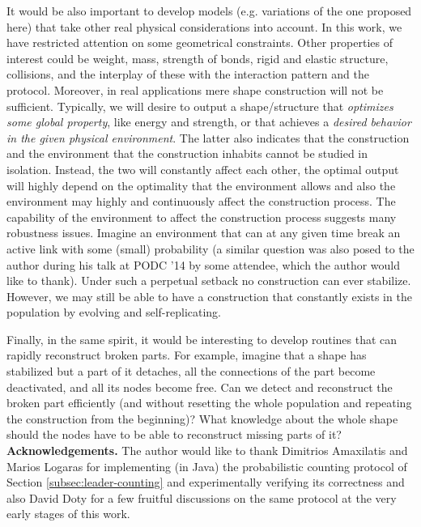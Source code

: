 \documentclass[oribibl, 11pt]{llncs}
\begin{document}
It would be also important to develop models (e.g. variations of the one proposed here) that take other real physical considerations into account. In this work, we have restricted attention on some geometrical constraints. Other properties of interest could be weight, mass, strength of bonds, rigid and elastic structure, collisions, and the interplay of these with the interaction pattern and the protocol. Moreover, in real applications mere shape construction will not be sufficient. Typically, we will desire to output a shape/structure that \emph{optimizes some global property}, like energy and strength, or that achieves a \emph{desired behavior in the given physical environment}. The latter also indicates that the construction and the environment that the construction inhabits cannot be studied in isolation. Instead, the two will constantly affect each other, the optimal output will highly depend on the optimality that the environment allows and also the environment may highly and continuously affect the construction process. The capability of the environment to affect the construction process suggests many robustness issues. Imagine an environment that can at any given time break an active link with some (small) probability (a similar question was also posed to the author during his talk at PODC '14 by some attendee, which the author would like to thank). Under such a perpetual setback no construction can ever stabilize. However, we may still be able to have a construction that constantly exists in the population by evolving and self-replicating.

Finally, in the same spirit, it would be interesting to develop routines that can rapidly reconstruct broken parts. For example, imagine that a shape has stabilized but a part of it detaches, all the connections of the part become deactivated, and all its nodes become free. Can we detect and reconstruct the broken part efficiently (and without resetting the whole population and repeating the construction from the beginning)? What knowledge about the whole shape should the nodes have to be able to reconstruct missing parts of it?\\

\noindent \textbf{Acknowledgements.} The author would like to thank Dimitrios Amaxilatis and Marios Logaras for implementing (in Java) the probabilistic counting protocol of Section \ref{subsec:leader-counting} and experimentally verifying its correctness and also David Doty for a few fruitful discussions on the same protocol at the very early stages of this work.
\end{document}

